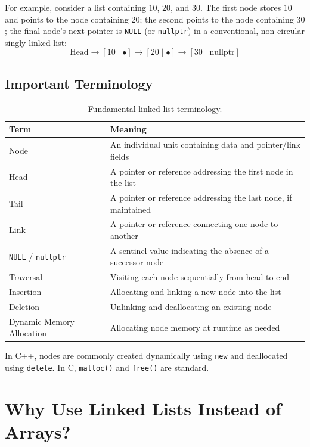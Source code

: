 For example, consider a list containing $10$, $20$, and $30$. The first node stores $10$ and points to the node containing $20$; the second points to the node containing $30$; the final node's next pointer is \texttt{NULL} (or \texttt{nullptr}) in a conventional, non-circular singly linked list:
\[
\text{Head} \longrightarrow [10 \mid \bullet] \longrightarrow [20 \mid \bullet] \longrightarrow [30 \mid \text{nullptr}]
\]

\subsection{Important Terminology}

\begin{table}[htbp]
\centering
\small
\begin{tabularx}{\textwidth}{l X}
\toprule
\textbf{Term} & \textbf{Meaning} \\
\midrule
Node                      & An individual unit containing data and pointer/link fields \\
Head                      & A pointer or reference addressing the first node in the list \\
Tail                      & A pointer or reference addressing the last node, if maintained \\
Link                      & A pointer or reference connecting one node to another \\
\texttt{NULL} / \texttt{nullptr} & A sentinel value indicating the absence of a successor node \\
Traversal                 & Visiting each node sequentially from head to end \\
Insertion                 & Allocating and linking a new node into the list \\
Deletion                  & Unlinking and deallocating an existing node \\
Dynamic Memory Allocation & Allocating node memory at runtime as needed \\
\bottomrule
\end{tabularx}
\caption{Fundamental linked list terminology.}
\end{table}

In C++, nodes are commonly created dynamically using \texttt{new} and deallocated using \texttt{delete}. In C, \texttt{malloc()} and \texttt{free()} are standard.

\section{Why Use Linked Lists Instead of Arrays?}

